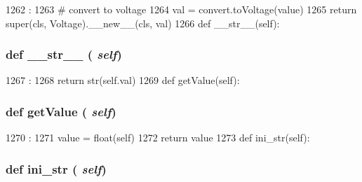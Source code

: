 \begin{DoxyCode}
1262                            :
1263         # convert to voltage
1264         val = convert.toVoltage(value)
1265         return super(cls, Voltage).__new__(cls, val)
1266 
    def __str__(self):
\end{DoxyCode}
\hypertarget{classm5_1_1params_1_1Voltage_aa7a4b9bc0941308e362738503137460e}{
\subsubsection[{\_\-\_\-str\_\-\_\-}]{\setlength{\rightskip}{0pt plus 5cm}def \_\-\_\-str\_\-\_\- ( {\em self})}}
\label{classm5_1_1params_1_1Voltage_aa7a4b9bc0941308e362738503137460e}



\begin{DoxyCode}
1267                      :
1268         return str(self.val)
1269 
    def getValue(self):
\end{DoxyCode}
\hypertarget{classm5_1_1params_1_1Voltage_acc340fbd4335fa34f9d57fb454b28ed0}{
\subsubsection[{getValue}]{\setlength{\rightskip}{0pt plus 5cm}def getValue ( {\em self})}}
\label{classm5_1_1params_1_1Voltage_acc340fbd4335fa34f9d57fb454b28ed0}



\begin{DoxyCode}
1270                       :
1271         value = float(self)
1272         return value
1273 
    def ini_str(self):
\end{DoxyCode}
\hypertarget{classm5_1_1params_1_1Voltage_a33ebe6cd32bcbd15465fc28b9d94bf82}{
\subsubsection[{ini\_\-str}]{\setlength{\rightskip}{0pt plus 5cm}def ini\_\-str ( {\em self})}}
\label{classm5_1_1params_1_1Voltage_a33ebe6cd32bcbd15465fc28b9d94bf82}


